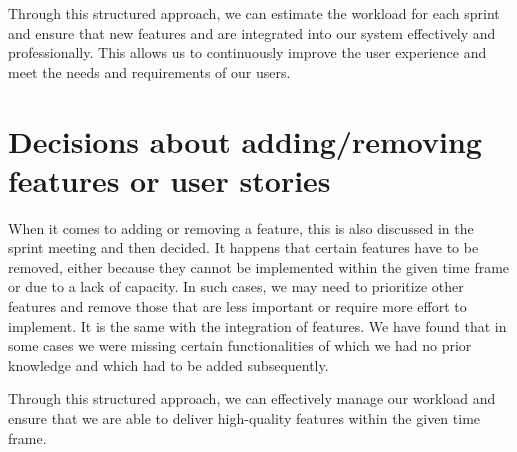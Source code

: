 \documentclass[12pt]{article}
\newcounter{fr}
\begin{document}
Through this structured approach, we can estimate the workload for each sprint and ensure that new features and  are integrated into our system effectively and professionally. This allows us to continuously improve the user experience and meet the needs and requirements of our users.

\section{Decisions about adding/removing features or user stories}
When it comes to adding or removing a feature, this is also discussed in the sprint meeting and then decided. It happens that certain features have to be removed, either because they cannot be implemented within the given time frame or due to a lack of capacity. In such cases, we may need to prioritize other features and remove those that are less important or require more effort to implement. It is the same with the integration of features. We have found that in some cases we were missing certain functionalities of which we had no prior knowledge and which had to be added subsequently.

Through this structured approach, we can effectively manage our workload and ensure that we are able to deliver high-quality features within the given time frame.
\end{document}
